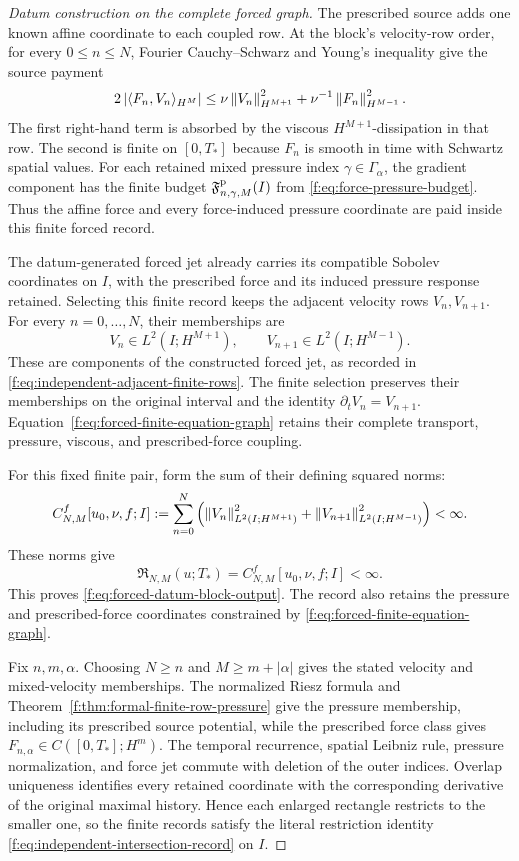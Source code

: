 \begin{proof}[Datum construction on the complete forced graph]
The prescribed source adds one known affine coordinate to each coupled row.
At the block's velocity-row order, for every \(0\le n\le N\), Fourier
Cauchy--Schwarz and Young's inequality give the source payment
\begin{equation}
 2\left|\langle F_n,V_n\rangle_{H^M}\right|
 \le \nu\left\lVert V_n\right\rVert_{H^{M+1}}^2
     +\nu^{-1}\left\lVert F_n\right\rVert_{H^{M-1}}^2.
 \label{f:eq:forced-finite-row-source-payment}
\end{equation}
The first right-hand term is absorbed by the viscous
\(H^{M+1}\)-dissipation in that row.  The second is finite on
\([0,T_*]\) because \(F_n\) is smooth in time with Schwartz spatial values.
For each retained mixed pressure index \(\gamma\in\Gamma_\alpha\), the
gradient component has the finite budget
\(\mathfrak F^{\rm p}_{n,\gamma,M}(I)\) from
\eqref{f:eq:force-pressure-budget}.  Thus the affine force and every
force-induced pressure coordinate are paid inside this finite forced record.

The datum-generated forced jet already carries its compatible Sobolev
coordinates on \(I\), with the prescribed force and its induced pressure
response retained. Selecting this finite record keeps the adjacent velocity
rows \(V_n,V_{n+1}\). For every \(n=0,\ldots,N\), their memberships are
\[
 V_n\in L^2(I;H^{M+1}),
 \qquad
 V_{n+1}\in L^2(I;H^{M-1}).
\]
These are components of the constructed forced jet, as recorded in
\eqref{f:eq:independent-adjacent-finite-rows}. The finite selection preserves
their memberships on the original interval and the identity
\(\partial_tV_n=V_{n+1}\). Equation~\eqref{f:eq:forced-finite-equation-graph}
retains their complete transport, pressure, viscous, and prescribed-force
coupling.

For this fixed finite pair, form the sum of their defining squared norms:
\[
 C^f_{N,M}[u_0,\nu,f;I]
 :=\sum_{n=0}^{N}\left(
  \left\lVert V_n\right\rVert_{L^2(I;H^{M+1})}^2
  +\left\lVert V_{n+1}\right\rVert_{L^2(I;H^{M-1})}^2
 \right)<\infty.
\]
These norms give
\begin{equation}
 \mathfrak R_{N,M}(u;T_*)
 =C^f_{N,M}[u_0,\nu,f;I]<\infty.
 \label{f:eq:forced-uniform-cutoff-output}
\end{equation}
This proves \eqref{f:eq:forced-datum-block-output}. The record also retains the pressure and
prescribed-force coordinates constrained by
\eqref{f:eq:forced-finite-equation-graph}.

Fix \(n,m,\alpha\).  Choosing \(N\ge n\) and
\(M\ge m+|\alpha|\) gives the stated
velocity and mixed-velocity memberships.  The normalized Riesz formula and
Theorem~\ref{f:thm:formal-finite-row-pressure} give the pressure membership,
including its prescribed source potential, while the prescribed force class
gives \(F_{n,\alpha}\in C([0,T_*];H^m)\).  The temporal recurrence, spatial
Leibniz rule, pressure normalization, and force jet commute with deletion of
the outer indices.  Overlap uniqueness identifies every retained coordinate
with the corresponding derivative of the original maximal history.  Hence
each enlarged rectangle restricts to the smaller one, so the finite records
satisfy the literal restriction identity
\eqref{f:eq:independent-intersection-record} on \(I\).
\end{proof}

